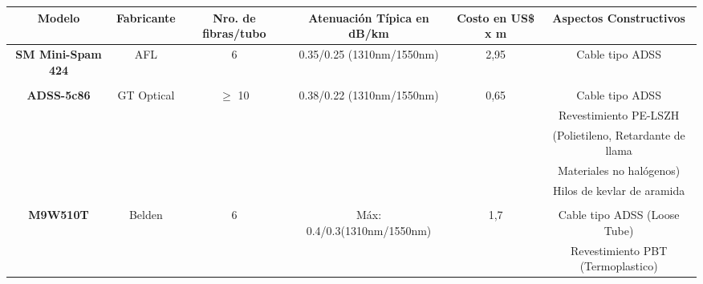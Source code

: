 \begin{table}[H]
  \tiny  
  \centering
    \begin{tabular}{|c|c|c|c|c|cc|}
    \hline
    \rowcolor[rgb]{ .773,  .851,  .945} \textbf{Modelo} & \textbf{Fabricante} & \textbf{Nro. de fibras/tubo} & \textbf{Atenuación Típica en dB/km} & \textbf{Costo en US\$ x m} & \multicolumn{2}{c|}{\textbf{Aspectos Constructivos}} \bigstrut\\
    \hline
    \multirow{6}[2]{*}{\textbf{SM Mini-Spam 424}} & \multirow{6}[2]{*}{AFL} & \multirow{6}[2]{*}{6} & \multirow{6}[2]{*}{0.35/0.25 (1310nm/1550nm)} & \multirow{6}[2]{*}{2,95} & \multicolumn{2}{c|}{Cable tipo ADSS} \bigstrut[t]\\
          &       &       &       &       & \multicolumn{2}{c|}{} \\
          &       &       &       &       & \multicolumn{2}{c|}{} \\
          &       &       &       &       & \multicolumn{2}{c|}{} \\
          &       &       &       &       & \multicolumn{2}{c|}{} \\
          &       &       &       &       & \multicolumn{2}{c|}{} \bigstrut[b]\\
    \hline
    \multirow{6}[2]{*}{\textbf{ADSS-5c86}} & \multirow{6}[2]{*}{GT Optical} & \multirow{6}[2]{*}{$\geq$ 10} & \multirow{6}[2]{*}{0.38/0.22 (1310nm/1550nm)} & \multirow{6}[2]{*}{0,65} & \multicolumn{2}{c|}{Cable tipo ADSS} \bigstrut[t]\\
          &       &       &       &       & \multicolumn{2}{c|}{Revestimiento PE-LSZH } \\
          &       &       &       &       & \multicolumn{2}{c|}{(Polietileno, Retardante de llama} \\
          &       &       &       &       & \multicolumn{2}{c|}{Materiales no halógenos)} \\
          &       &       &       &       & \multicolumn{2}{c|}{Hilos de kevlar de aramida} \\
          &       &       &       &       & \multicolumn{2}{c|}{} \bigstrut[b]\\
    \hline
    \multirow{9}[2]{*}{\textbf{M9W510T}} & \multirow{9}[2]{*}{Belden} & \multirow{9}[2]{*}{6} & \multirow{9}[2]{*}{Máx: 0.4/0.3(1310nm/1550nm)} & \multirow{9}[2]{*}{1,7} & \multicolumn{2}{c|}{Cable tipo ADSS (Loose Tube)} \bigstrut[t]\\
          &       &       &       &       & \multicolumn{2}{c|}{Revestimiento PBT (Termoplastico)} \\

\end{tabular}
\end{table}
